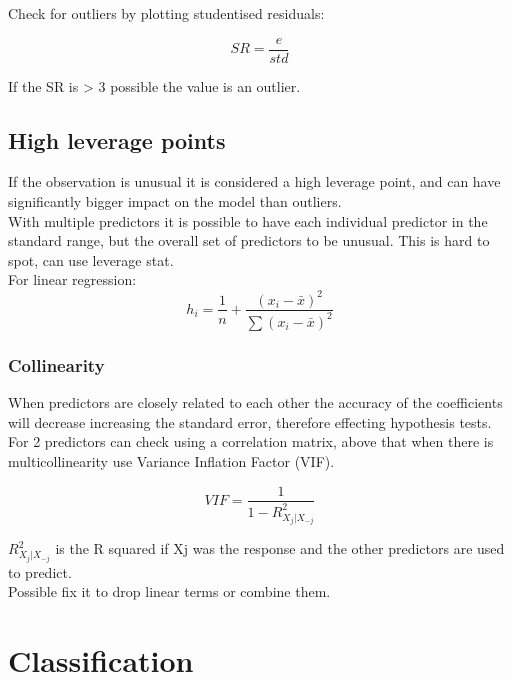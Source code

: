 \documentclass[11pt]{scrartcl} %
\begin{document}
Check for outliers by plotting studentised residuals:

\begin{equation}
	SR = \frac{e}{std}	
\end{equation}

If the SR is > 3 possible the value is an outlier.

\subsection{High leverage points}

If the observation is unusual it is considered a high leverage point, and can have significantly bigger impact
on the model than outliers.\\

With multiple predictors it is possible to have each individual predictor in the standard range, but the overall set
of predictors to be unusual. This is hard to spot, can use leverage stat.\\

For linear regression:
\begin{equation}
	h_i = \frac{1}{n} + \frac{(x_i-\bar{x})^2}{\sum{(x_i-\bar{x})^2}}
\end{equation}

\subsubsection{Collinearity}

When predictors are closely related to each other the accuracy of the coefficients will decrease increasing
the standard error, therefore effecting hypothesis tests.\\

For 2 predictors can check using a correlation matrix, above that when there is multicollinearity use 
Variance Inflation Factor (VIF).

\begin{equation}
	VIF = \frac{1}{1 - R^2_{X_j|X_{-j}}}
\end{equation}

\(R^2_{X_j|X_{-j}}\) is the R squared if Xj was the response and the other predictors are used to predict.\\

Possible fix it to drop linear terms or combine them.

\section{Classification}
\end{document}
